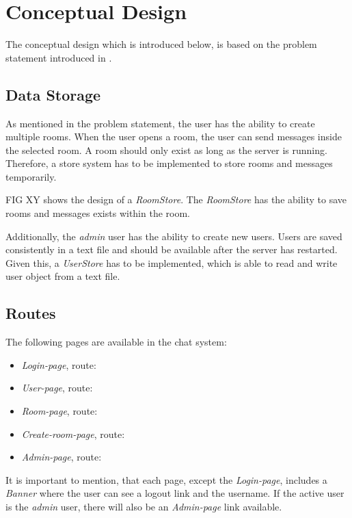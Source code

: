 \section{Conceptual Design}\label{sec:02_design}
The conceptual design which is introduced below, is based on the problem statement introduced in .


\subsection{Data Storage}\label{subsec:02_design_datastorage}
As mentioned in the problem statement, the user has the ability to create multiple rooms. When the user opens a room, the user can send messages inside the selected room. A room should only exist as long as the server is running. Therefore, a store system has to be implemented to store rooms and messages temporarily.

FIG XY shows the design of a \textit{RoomStore}. The \textit{RoomStore} has the ability to save rooms and messages exists within the room.


Additionally, the \textit{admin} user has the ability to create new users. Users are saved consistently in a text file and should be available after the server has restarted.
Given this, a \textit{UserStore} has to be implemented, which is able to read and write user object from a text file.


\subsection{Routes}\label{subsec:02_design_routes}
The following pages are available in the chat system:
\begin{itemize}
\item \textit{Login-page}, route: 
\item \textit{User-page}, route: 
\item \textit{Room-page}, route: 
\item \textit{Create-room-page}, route: 
\item \textit{Admin-page}, route: 
\end{itemize}

It is important to mention, that each page, except the \textit{Login-page}, includes a \textit{Banner} where the user can see a logout link and the username. If the active user is the \textit{admin} user, there will also be an \textit{Admin-page} link available.

